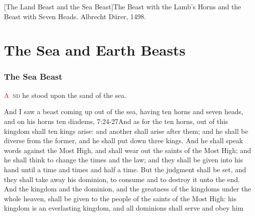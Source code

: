 [The Land Beast and the Sea Beast]{The Beast with the Lamb's Horns and the Beast with Seven Heads. Albrecht Dürer, 1498.}

\chapter{The Sea and Earth Beasts}
\subsection*{The Sea Beast}
\lettrine[lines=3, slope=0.5em]{\textcolor{red}{A}}{\ nd} he stood upon the sand of the sea.

\zz And I saw a beast coming up out of the sea, having ten horns and seven heads, and on his horns ten diadems,%
					   {7:24-27}{And as for the ten horns, out of this kingdom shall ten kings arise: and another shall arise after them; and he shall be diverse from the former, and he shall put down three kings. And he shall speak words against the Most High, and shall wear out the saints of the Most High; and he shall think to change the times and the law; and they shall be given into his hand until a time and times and half a time. But the judgment shall be set, and they shall take away his dominion, to consume and to destroy it unto the end. And the kingdom and the dominion, and the greatness of the kingdoms under the whole heaven, shall be given to the people of the saints of the Most High: his kingdom is an everlasting kingdom, and all dominions shall serve and obey him}
